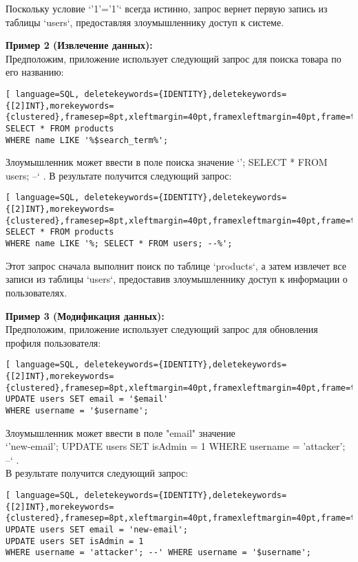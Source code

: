 \documentclass[a4paper,12pt]{diplom}
\begin{document}
	Поскольку условие `'1'='1'` всегда истинно, запрос вернет первую запись из таблицы `users`,  предоставляя злоумышленнику доступ к системе.
	
	\textbf{Пример 2 (Извлечение данных):}\\
	Предположим, приложение использует следующий запрос для поиска товара по его названию:
	\begin{lstlisting}[ language=SQL, deletekeywords={IDENTITY},deletekeywords={[2]INT},morekeywords={clustered},framesep=8pt,xleftmargin=40pt,framexleftmargin=40pt,frame=tb,framerule=0pt]		
SELECT * FROM products 
WHERE name LIKE '%$search_term%';
	\end{lstlisting}	
	Злоумышленник может ввести в поле поиска значение `'; SELECT * FROM users; --` .  В результате получится следующий запрос: 
	\begin{lstlisting}[ language=SQL, deletekeywords={IDENTITY},deletekeywords={[2]INT},morekeywords={clustered},framesep=8pt,xleftmargin=40pt,framexleftmargin=40pt,frame=tb,framerule=0pt]		
SELECT * FROM products 
WHERE name LIKE '%; SELECT * FROM users; --%'; 
	\end{lstlisting}	
	Этот запрос сначала выполнит поиск по таблице `products`, а затем извлечет все записи из таблицы `users`, предоставив злоумышленнику доступ к информации о пользователях.
	
	\textbf{Пример 3 (Модификация данных):}\\
	Предположим, приложение использует следующий запрос для обновления профиля пользователя:
	\begin{lstlisting}[ language=SQL, deletekeywords={IDENTITY},deletekeywords={[2]INT},morekeywords={clustered},framesep=8pt,xleftmargin=40pt,framexleftmargin=40pt,frame=tb,framerule=0pt]		
UPDATE users SET email = '$email' 
WHERE username = '$username';
	\end{lstlisting}
	
	Злоумышленник может ввести в поле "email" значение \\
	`'new-email'; UPDATE users SET isAdmin = 1 WHERE username = 'attacker'; --` . \\
	В результате получится следующий запрос:
	
	\begin{lstlisting}[ language=SQL, deletekeywords={IDENTITY},deletekeywords={[2]INT},morekeywords={clustered},framesep=8pt,xleftmargin=40pt,framexleftmargin=40pt,frame=tb,framerule=0pt]		
UPDATE users SET email = 'new-email'; 
UPDATE users SET isAdmin = 1
WHERE username = 'attacker'; --' WHERE username = '$username';
	\end{lstlisting}
	
\end{document}
